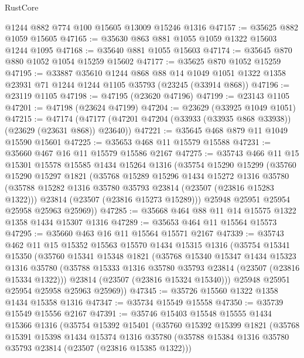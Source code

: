 \begin{lexlean}{RustCore}
\begin{coremodule}
    @1244
    @882
    @774
    @100
    @15605
    @13009
    @15246
    @1316
@47157 := @35625 @882 @1059 @15605
@47165 := @35630 @863 @881 @1055 @1059 @1322 @15603 @1244 @1095
@47168 := @35640 @881 @1055 @15603
@47174 := @35645 @870 @880 @1052 @1054 @15259 @15602
@47177 := @35625 @870 @1052 @15259
@47195 := @33887
    @35610
    @1244
    @868
    @88
    @14
    @1049
    @1051
    @1322
    @1358
    @23931
    @71
    @1244
    @1244
    @1105
    @35793
    (@23245 (@33914 @868))
@47196 := @23119 @1105
@47198 := @47195 (@23620 @47196)
@47199 := @23143 @1105
@47201 := @47198 (@23624 @47199)
@47204 := @23629 (@33925 @1049 @1051)
@47215 := @47174
    (@47177 (@47201 @47204 (@33933 (@33935 @868 @33938)) (@23629 (@23631 @868)) @23640))
@47221 := @35645 @468 @879 @11 @1049 @15590 @15601
@47225 := @35653 @468 @11 @15579 @15588
@47231 := @35660 @467 @16 @11 @15579 @15586 @2167
@47275 := @35743
    @466
    @11
    @15
    @15301
    @15578
    @15585
    @1434
    @15264
    @1316
    (@35754
      @15290
      @15299
      (@35760
        @15290
        @15297
        @1821
        (@35768
          @15289
          @15296
          @1434
          @15272
          @1316
          @35780
          (@35788 @15282 @1316 @35780 @35793 @23814 (@23507 (@23816 @15283 @1322)))
          @23814
          (@23507 (@23816 @15273 @15289)))
        @25948
        @25951
        @25954
        @25958
        @25963
        @25969))
@47285 := @35668 @464 @88 @11 @14 @15575 @1322 @1358 @1434 @15307 @1316
@47289 := @35653 @464 @11 @15564 @15573
@47295 := @35660 @463 @16 @11 @15564 @15571 @2167
@47339 := @35743
    @462
    @11
    @15
    @15352
    @15563
    @15570
    @1434
    @15315
    @1316
    (@35754
      @15341
      @15350
      (@35760
        @15341
        @15348
        @1821
        (@35768
          @15340
          @15347
          @1434
          @15323
          @1316
          @35780
          (@35788 @15333 @1316 @35780 @35793 @23814 (@23507 (@23816 @15334 @1322)))
          @23814
          (@23507 (@23816 @15324 @15340)))
        @25948
        @25951
        @25954
        @25958
        @25963
        @25969))
@47345 := @35726 @15560 @1322 @1358 @1434 @15358 @1316
@47347 := @35734 @15549 @15558
@47350 := @35739 @15549 @15556 @2167
@47391 := @35746
    @15403
    @15548
    @15555
    @1434
    @15366
    @1316
    (@35754
      @15392
      @15401
      (@35760
        @15392
        @15399
        @1821
        (@35768
          @15391
          @15398
          @1434
          @15374
          @1316
          @35780
          (@35788 @15384 @1316 @35780 @35793 @23814 (@23507 (@23816 @15385 @1322)))

\end{coremodule}
\end{lexlean}
